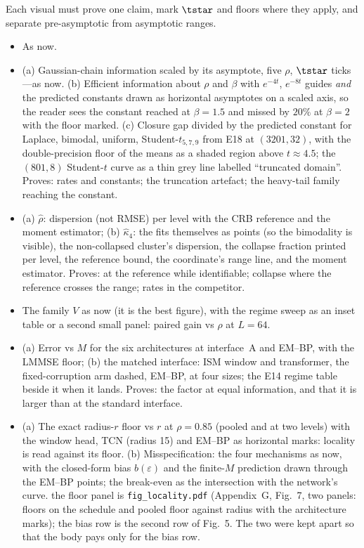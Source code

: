 Each visual must prove one claim, mark $\tstar$ and floors where they apply, and separate pre-asymptotic from asymptotic ranges.

\begin{itemize}
\item {} As now.
\item {} (a) Gaussian-chain information scaled by its asymptote, five $\rho$, $\tstar$ ticks---as now. (b) Efficient information about $\rho$ and $\beta$ with $e^{-4t}$, $e^{-8t}$ guides \emph{and} the predicted constants drawn as horizontal asymptotes on a scaled axis, so the reader sees the constant reached at $\beta=1.5$ and missed by $20\%$ at $\beta=2$ with the floor marked. (c) Closure gap divided by the predicted constant for Laplace, bimodal, uniform, Student-$t_{5,7,9}$ from E18 at $(3201,32)$, with the double-precision floor of the means as a shaded region above $t\approx4.5$; the $(801,8)$ Student-$t$ curve as a thin grey line labelled ``truncated domain''. Proves: rates and constants; the truncation artefact; the heavy-tail family reaching the constant.
\item {} (a) $\hat\rho$: dispersion (not RMSE) per level with the CRB reference and the moment estimator; (b) $\hat\kappa_4$: the fits themselves as points (so the bimodality is visible), the non-collapsed cluster's dispersion, the collapse fraction printed per level, the reference bound, the coordinate's range line, and the moment estimator. Proves: at the reference while identifiable; collapse where the reference crosses the range; rates in the competitor.
\item {} The family $V$ as now (it is the best figure), with the regime sweep as an inset table or a second small panel: paired gain vs $\rho$ at $L=64$.
\item {} (a) Error vs $M$ for the six architectures at interface~A and EM--BP, with the LMMSE floor; (b) the matched interface: ISM window and transformer, the fixed-corruption arm dashed, EM--BP, at four sizes; the E14 regime table beside it when it lands. Proves: the factor at equal information, and that it is larger than at the standard interface.
\item {} (a) The exact radius-$r$ floor vs $r$ at $\rho=0.85$ (pooled and at two levels) with the window head, TCN (radius 15) and EM--BP as horizontal marks: locality is read against its floor. (b) Misspecification: the four mechanisms as now, with the closed-form bias $b(\varepsilon)$ and the finite-$M$ prediction drawn through the EM--BP points; the break-even as the intersection with the network's curve.  the floor panel is \texttt{fig\_locality.pdf} (Appendix~G, Fig.~7, two panels: floors on the schedule and pooled floor against radius with the architecture marks); the bias row is the second row of Fig.~5. The two were kept apart so that the body pays only for the bias row.

\end{itemize}

